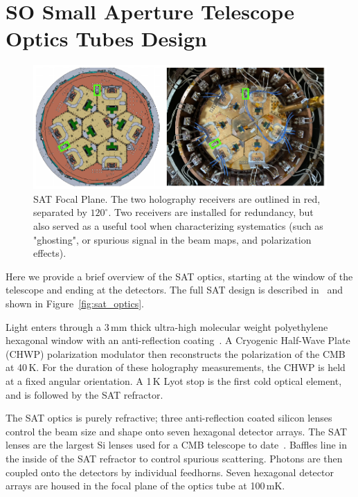 \section{SO Small Aperture Telescope Optics Tubes Design}
\label{sec:sat_optics_tube}

\begin{figure}[t!]
    \centering
    \includegraphics[width = \textwidth]{Figures/sat_fpa.pdf}
    \caption{SAT Focal Plane.  The two holography receivers are outlined in red, separated by $120^{\circ}$.  Two receivers are installed for redundancy, but also served as a useful tool when characterizing systematics (such as "ghosting", or spurious signal in the beam maps, and polarization effects).}
    \label{fig:sat_fpa}
\end{figure}

Here we provide a brief overview of the SAT optics, starting at the window of the telescope and ending at the detectors.  The full SAT design is described in~\cite{ali20,2020SPIE11445E7LK} and shown in Figure~\ref{fig:sat_optics}.


Light enters through a 3\,mm thick ultra-high molecular weight polyethylene hexagonal window with an anti-reflection coating~\cite{zhu18}.  A Cryogenic Half-Wave Plate (CHWP) polarization modulator then reconstructs the polarization of the CMB at 40\,K.  For the duration of these holography measurements, the CHWP is held at a fixed angular orientation.  A 1\,K Lyot stop is the first cold optical element, and is followed by the SAT refractor.

The SAT optics is purely refractive; three anti-reflection coated silicon lenses~\cite{Datta:13,golec20} control the beam size and shape onto seven hexagonal detector arrays.  The SAT lenses are the largest Si lenses used for a CMB telescope to date~\cite{ali20}.  Baffles line in the inside of the SAT refractor to control spurious scattering.  Photons are then coupled onto the detectors by individual feedhorns. Seven hexagonal detector arrays are housed in the focal plane of the optics tube at 100\,mK.

